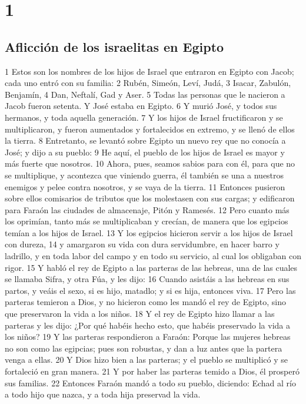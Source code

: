 

\chapter{1}

\section{Aflicción de los israelitas en Egipto}

1 Estos son los nombres de los hijos de Israel que entraron en Egipto con Jacob; cada uno entró con su familia:
2 Rubén, Simeón, Leví, Judá,
3 Isacar, Zabulón, Benjamín,
4 Dan, Neftalí, Gad y Aser.
5 Todas las personas que le nacieron a Jacob fueron setenta. Y José estaba en Egipto.
6 Y murió José, y todos sus hermanos, y toda aquella generación.
7 Y los hijos de Israel fructificaron y se multiplicaron, y fueron aumentados y fortalecidos en extremo, y se llenó de ellos la tierra.
8 Entretanto, se levantó sobre Egipto un nuevo rey que no conocía a José; y dijo a su pueblo:
9 He aquí, el pueblo de los hijos de Israel es mayor y más fuerte que nosotros.
10 Ahora, pues, seamos sabios para con él, para que no se multiplique, y acontezca que viniendo guerra, él también se una a nuestros enemigos y pelee contra nosotros, y se vaya de la tierra.
11 Entonces pusieron sobre ellos comisarios de tributos que los molestasen con sus cargas; y edificaron para Faraón las ciudades de almacenaje, Pitón y Ramesés.
12 Pero cuanto más los oprimían, tanto más se multiplicaban y crecían, de manera que los egipcios temían a los hijos de Israel.
13 Y los egipcios hicieron servir a los hijos de Israel con dureza,
14 y amargaron su vida con dura servidumbre, en hacer barro y ladrillo, y en toda labor del campo y en todo su servicio, al cual los obligaban con rigor.
15 Y habló el rey de Egipto a las parteras de las hebreas, una de las cuales se llamaba Sifra, y otra Fúa, y les dijo:
16 Cuando asistáis a las hebreas en sus partos, y veáis el sexo, si es hijo, matadlo; y si es hija, entonces viva.
17 Pero las parteras temieron a Dios, y no hicieron como les mandó el rey de Egipto, sino que preservaron la vida a los niños.
18 Y el rey de Egipto hizo llamar a las parteras y les dijo: ¿Por qué habéis hecho esto, que habéis preservado la vida a los niños?
19 Y las parteras respondieron a Faraón: Porque las mujeres hebreas no son como las egipcias; pues son robustas, y dan a luz antes que la partera venga a ellas.
20 Y Dios hizo bien a las parteras; y el pueblo se multiplicó y se fortaleció en gran manera.
21 Y por haber las parteras temido a Dios, él prosperó sus familias.
22 Entonces Faraón mandó a todo su pueblo, diciendo: Echad al río a todo hijo que nazca, y a toda hija preservad la vida.

